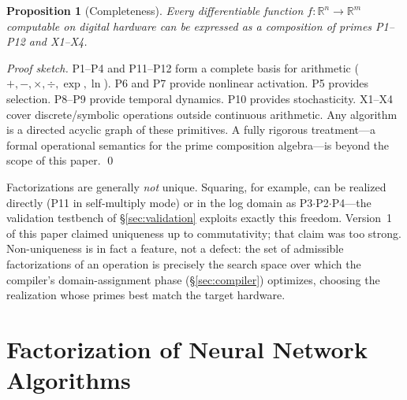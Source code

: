 \documentclass[11pt]{article}
\newtheorem{proposition}{Proposition}
\begin{document}
\begin{proposition}[Completeness]
Every differentiable function $f: \mathbb{R}^n \to \mathbb{R}^m$ computable on digital hardware can be expressed as a composition of primes P1--P12 and X1--X4.
\end{proposition}

\begin{proof}[Proof sketch]
P1--P4 and P11--P12 form a complete basis for arithmetic ($+, -, \times, \div, \exp, \ln$). P6 and P7 provide nonlinear activation. P5 provides selection. P8--P9 provide temporal dynamics. P10 provides stochasticity. X1--X4 cover discrete/symbolic operations outside continuous arithmetic. Any algorithm is a directed acyclic graph of these primitives. A fully rigorous treatment---a formal operational semantics for the prime composition algebra---is beyond the scope of this paper. \qed
\end{proof}

Factorizations are generally \textit{not} unique. Squaring, for example, can be realized directly (P11 in self-multiply mode) or in the log domain as P3$\cdot$P2$\cdot$P4---the validation testbench of \S\ref{sec:validation} exploits exactly this freedom. Version~1 of this paper claimed uniqueness up to commutativity; that claim was too strong. Non-uniqueness is in fact a feature, not a defect: the set of admissible factorizations of an operation is precisely the search space over which the compiler's domain-assignment phase (\S\ref{sec:compiler}) optimizes, choosing the realization whose primes best match the target hardware.

\section{Factorization of Neural Network Algorithms}
\label{sec:factorization}
\end{document}
